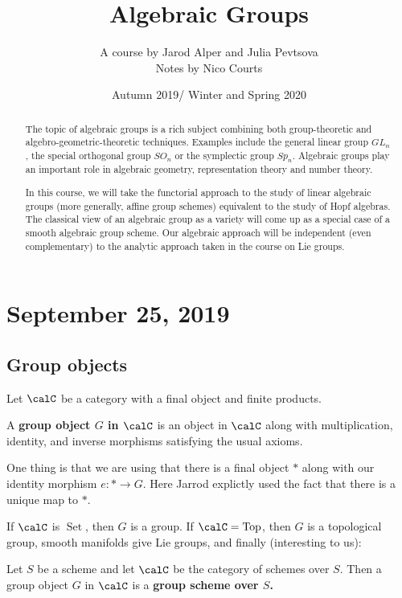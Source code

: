 \documentclass[12pt]{article}
\DeclareMathOperator{\1}{\mathbbm{1}}
\begin{document}
\title{Algebraic Groups\vspace{-1ex}}
\author{A course by Jarod Alper and Julia Pevtsova\\
Notes by Nico Courts}
\date{Autumn 2019/ Winter and Spring 2020}
\maketitle

\begin{abstract}
	The topic of algebraic groups is a rich subject combining both group-theoretic and algebro-geometric-theoretic techniques. Examples include the general linear group $GL_n$, 
	the special orthogonal group $SO_n$ or the symplectic group $Sp_n$. Algebraic groups play an important role in algebraic geometry, representation theory and number theory.

	In this course, we will take the functorial approach to the study of linear algebraic groups (more generally, affine group schemes) equivalent to the study of Hopf algebras. 
	The classical view of an algebraic group as a variety will come up as a special case of a smooth algebraic group scheme. Our algebraic approach will be independent (even complementary) to the analytic approach taken in the course on Lie groups.
\end{abstract}

\section{September 25, 2019}
\subsection{Group objects}
Let $\calC$ be a category with a final object and finite products.
\begin{defn}
	A \textbf{group object $G$ in $\calC$} is an object in $\calC$ along with multiplication, identity, and inverse morphisms
	satisfying the usual axioms.
\end{defn}

One thing is that we are using that there is a final object $\ast$ along with our identity morphism $e:\ast\to G$.
Here Jarrod explictly used the fact that there is a unique map to $\ast$.

\begin{ex}
	If $\calC$ is $\operatorname{Set}$, then $G$ is a group. If $\calC=\operatorname{Top}$, then $G$ is a topological group, smooth manifolds give Lie groups, and finally (interesting to us):
\end{ex}
\begin{defn}
	Let $S$ be a scheme and let $\calC$ be the category of schemes over $S$. Then a group object $G$ in $\calC$ is 
	a \textbf{group scheme over $S$.}
\end{defn}
\end{document}
